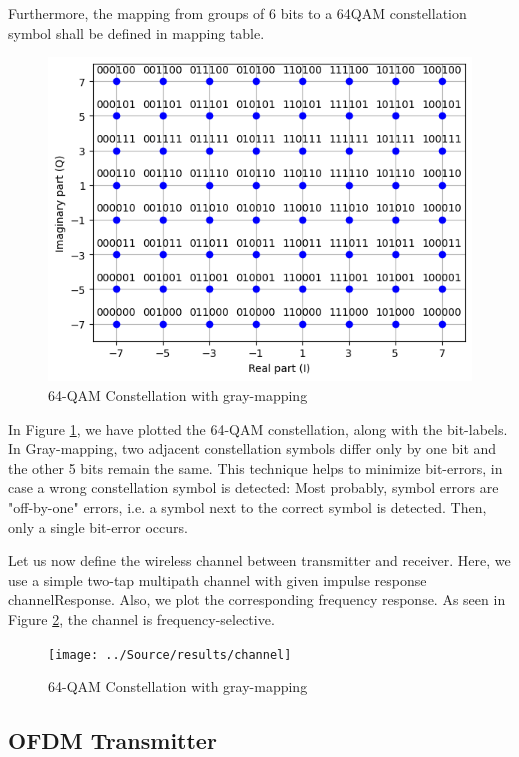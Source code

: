 Furthermore, the mapping from groups of 6 bits to a 64QAM constellation symbol shall be defined in mapping table.

\begin{figure}[htbp]
    \centering
    \includegraphics[width=\textwidth]{../Source/results/mapping}
    \caption{64-QAM Constellation with gray-mapping}
    \label{mapping}
\end{figure}

In Figure \ref{mapping}, we have plotted the 64-QAM constellation, along with the bit-labels. In Gray-mapping, two adjacent constellation symbols differ only by one bit and the other 5 bits remain the same. This technique helps to minimize bit-errors, in case a wrong constellation symbol is detected: Most probably, symbol errors are "off-by-one" errors, i.e. a symbol next to the correct symbol is detected. Then, only a single bit-error occurs.

Let us now define the wireless channel between transmitter and receiver. Here, we use a simple two-tap multipath channel with given impulse response channelResponse. Also, we plot the corresponding frequency response. As seen in Figure \ref{channel}, the channel is frequency-selective.

\begin{figure}[htbp]
    \centering
    \texttt{[image: ../Source/results/channel]}
    \caption{64-QAM Constellation with gray-mapping}
    \label{channel}
\end{figure}

\subsection{OFDM Transmitter}

